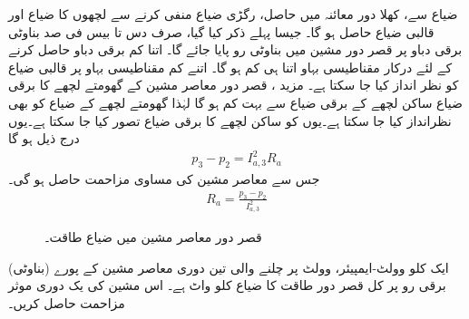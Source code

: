 ضیاع  سے، کھلا دور معائنہ میں حاصل، رگڑی ضیاع  منفی کرنے سے لچھوں کا ضیاع اور قالبی ضیاع حاصل ہو گا۔ جیسا پہلے ذکر کیا گیا، صرف دس تا بیس فی صد بناوٹی برقی دباو پر قصر دور مشین میں بناوٹی رو پایا جائے گا۔ اتنا کم برقی دباو حاصل کرنے کے لئے درکار مقناطیسی بہاو اتنا ہی کم ہو گا۔ اتنے کم مقناطیسی بہاو پر قالبی ضیاع کو نظر انداز کیا جا سکتا ہے۔ مزید ، قصر دور معاصر مشین کے گھومتے لچھے کا برقی ضیاع ساکن لچھے کے برقی ضیاع سے بہت کم ہو گا لہٰذا  گھومتے لچھے کے ضیاع کو بھی نظرانداز کیا جا سکتا ہے۔یوں  کو ساکن لچھے کا برقی ضیاع تصور کیا جا سکتا ہے۔یوں درج ذیل ہو گا
\begin{align*}
p_3-p_2=I_{a,3}^2 R_a
\end{align*}
جس  سے معاصر مشین کی مساوی مزاحمت حاصل ہو گی۔
\begin{align}
R_a=\frac{p_3-p_2}{I_{a,3}^2}
\end{align}
%
\begin{figure}
\centering
\caption{قصر دور معاصر مشین میں ضیاع طاقت۔}
\label{شکل_معاصر_کسر_دور_ضیاع}
\end{figure}
ایک   کلو وولٹ-ایمپیئر،   وولٹ پر چلنے والی تین دوری معاصر مشین کے پورے (بناوٹی) برقی رو پر  کل قصر دور طاقت کا ضیاع   کلو واٹ ہے۔ اس مشین کی یک دوری موثر مزاحمت حاصل کریں۔

